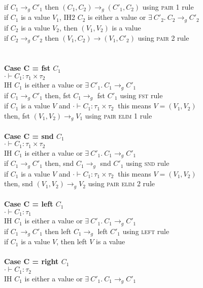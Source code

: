 \documentclass{article}
\begin{document}
if $C_1 \to_g C'_1$ then $(C_1,C_2) \to_g (C'_1, C_2)$ using \textsc{pair 1} rule\\
if $C_1$ is a value $V_1$, IH2 $C_2$ is either a value or $  \exists \ C'_2.\ C_2 \to_g C'_2 $ \\
if $C_2$ is a value $V_2$, then $(V_1,V_2)$ is a value \\
if $C_2 \to_g C'_2$ then $(V_1,C_2) \to (V_1,C'_2)$ using \textsc{pair 2} rule \\ \\ \\
\textbf{Case C = fst $C_1$} \\
$\cdot \vdash C_1: \tau_1 \times \tau_2\ $\\
IH $C_1$ is either a value or $  \exists \ C'_1.\ C_1 \to_g C'_1 $ \\
if $C_1 \to_g C'_1$ then, fst $C_1 \to_g$ fst $C'_1$ using \textsc{fst} rule\\
if $C_1$ is a value $V$ and $\cdot \vdash C_1: \tau_1 \times \tau_2\ $ this means $V = (V_1, V_2)$ \\ 
then, fst $(V_1, V_2) \to_g V_1$ using \textsc{pair elim 1} rule\\ \\
\textbf{Case C = snd $C_1$} \\
$\cdot \vdash C_1: \tau_1 \times \tau_2\ $\\
IH $C_1$ is either a value or $  \exists \ C'_1.\ C_1 \to_g C'_1 $ \\
if $C_1 \to_g C'_1$ then, snd $C_1 \to_g$ snd $C'_1$ using \textsc{snd} rule\\
if $C_1$ is a value $V$ and $\cdot \vdash C_1: \tau_1 \times \tau_2\ $ this means $V = (V_1, V_2)$ \\ 
then, snd $(V_1, V_2) \to_g V_2$ using \textsc{pair elim 2} rule\\ \\
\textbf{Case C = left $C_1$} \\
$\cdot \vdash C_1: \tau_1$\\
IH $C_1$ is either a value or $  \exists \ C'_1.\ C_1 \to_g C'_1 $ \\
if $C_1 \to_g C'_1$ then left $C_1 \to_g$ left $C'_1$ using \textsc{left} rule\\
if $C_1$ is a value $V$, then left $V$ is a value\\ \\
\textbf{Case C = right $C_1$} \\
$\cdot \vdash C_1: \tau_2$ \\
IH $C_1$ is either a value or $  \exists \ C'_1.\ C_1 \to_g C'_1 $ \\
\end{document}

